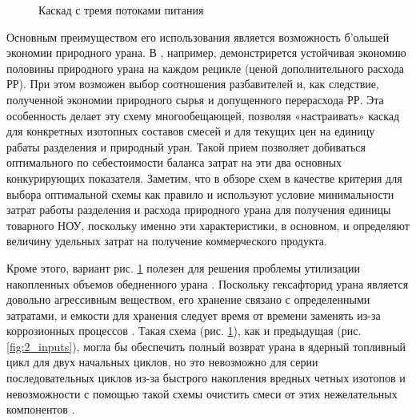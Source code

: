 \begin{figure}[ht]
  \caption{Каскад с тремя потоками питания}\label{fig:3_inputs}
\end{figure}

Основным преимуществом его использования является возможность б'ольшей экономии природного урана. В \cite{smirnovApplyingEnrichmentCapacities2018}, например, демонстрирется устойчивая экономию половины природного урана на каждом рецикле (ценой дополнительного расхода РР). При этом возможен выбор соотношения разбавителей и, как следствие, полученной экономии природного сырья и допущенного перерасхода РР. Эта особенность делает эту схему многообещающей, позволяя «настраивать» каскад для конкретных изотопных составов смесей и для текущих цен на единицу рабаты разделения и природный уран. Такой прием позволяет добиваться оптимального по себестоимости баланса затрат на эти два основных конкурирующих показателя. Заметим, что в обзоре схем в качестве критерия для выбора оптимальной схемы как правило и используют условие минимальности затрат работы разделения и расхода природного урана для получения единицы товарного НОУ, поскольку именно эти характеристики, в основном, и определяют величину удельных затрат на получение коммерческого продукта.

Кроме этого, вариант рис. \ref{fig:3_inputs} полезен для решения проблемы утилизации накопленных объемов обедненного урана \cite{smirnovEnrichmentRegeneratedUranium2014}. Поскольку гексафторид урана является довольно агрессивным веществом, его хранение связано с определенными затратами, и емкости для хранения следует время от времени заменять из-за коррозионных процессов \cite{fitchOPTIONSDISPOSALREAPPLICATION2009, oecdManagementDepletedUranium2001}.
Такая схема (рис. \ref{fig:3_inputs}), как и предыдущая (рис. \ref{fig:2_inputs}), могла бы обеспечить полный возврат урана в ядерный топливный цикл для двух начальных циклов, но это невозможно для серии последовательных циклов из-за быстрого накопления вредных четных изотопов и невозможности с помощью такой схемы очистить смеси от этих нежелательных компонентов \cite{smirnovApplyingEnrichmentCapacities2018}.

